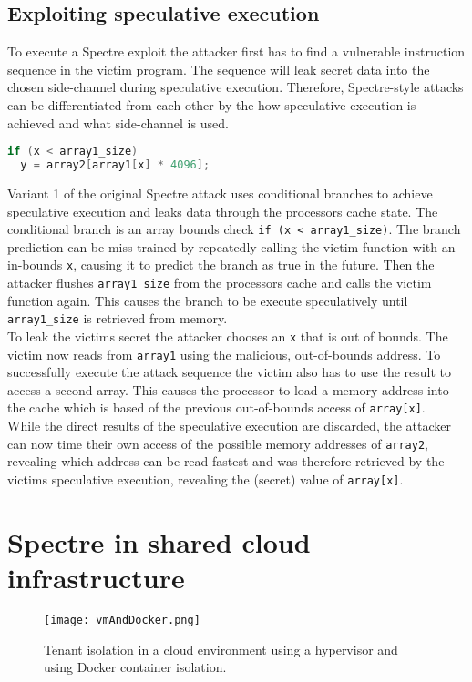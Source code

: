 \documentclass[conference,compsoc,final,a4paper]{IEEEtran}
\begin{document}
\subsection{Exploiting speculative execution}
To execute a Spectre exploit the attacker first has to find a vulnerable instruction sequence in the victim program. The sequence will leak secret data into the chosen
side-channel during speculative execution. Therefore, Spectre-style attacks can be differentiated from each other by the how speculative execution is achieved
and what side-channel is used. \cite{kocher2018spectre} \\
\begin{lstlisting}[language=C, caption=Spectre Variant 1 example \cite{kocher2018spectre}]
if (x < array1_size)
  y = array2[array1[x] * 4096];
\end{lstlisting}
Variant 1 of the original Spectre attack uses conditional branches to achieve speculative execution and leaks data through the processors cache state. The conditional branch is an array bounds check \lstinline|if (x < array1_size)|. The branch prediction can be miss-trained by repeatedly calling the victim function with an in-bounds \lstinline|x|, causing it to predict the branch as true in the future. Then the attacker flushes \lstinline|array1_size| from the processors cache and calls the victim function again. This causes the branch to be execute speculatively until \lstinline|array1_size| is retrieved from memory. \\
To leak the victims secret the attacker chooses an \lstinline|x| that is out of bounds. The victim now reads from \lstinline|array1| using the malicious, out-of-bounds address. To successfully execute the attack sequence the victim also has to use the result to access a second array. This causes the processor to load a memory address into the cache which is based of the previous out-of-bounds access of \lstinline|array[x]|. \\
While the direct results of the speculative execution are discarded, the attacker can now time their own access of the possible memory addresses of \lstinline|array2|, revealing which address can be read fastest and was therefore retrieved by the victims speculative execution, revealing the (secret) value of \lstinline|array[x]|.
\section{Spectre in shared cloud infrastructure}
\begin{figure}[!ht]
\centering
\texttt{[image: vmAndDocker.png]}
\caption{Tenant isolation in a cloud environment using a hypervisor and using Docker container isolation.}
\label{virtmem}
\end{figure}
\end{document}
